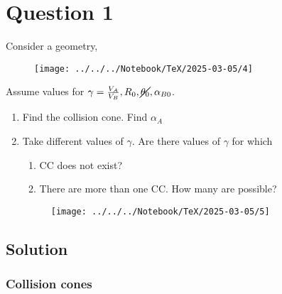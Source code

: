 \section*{Question 1}

Consider a geometry,
\vspace*{-1.5em}
\begin{figure}[htbp]
      \centering
      \texttt{[image: ../../../Notebook/TeX/2025-03-05/4]}
\end{figure}
\vspace*{-1.5em}
Assume values for \( \gamma = \frac{V_A}{V_B}, R_0, \cancel{\theta_0}, \alpha_{B0} \).
\begin{enumerate}[label= (\alph*), noitemsep, topsep=0pt]
      \item Find the collision cone.
            Find \( \alpha_A \)
      \item Take different values of \( \gamma \).
            Are there values of \( \gamma \) for which
            \begin{enumerate}[label= (\alph*), noitemsep, topsep=0pt]
                  \item CC does not exist?
                  \item There are more than one CC.
                        How many are possible?
            \end{enumerate}
            \vspace*{-1.5em}
            \begin{figure}[htbp]
                  \centering
                  \texttt{[image: ../../../Notebook/TeX/2025-03-05/5]}
            \end{figure}
\end{enumerate}

\vspace*{-3em}
\subsection*{Solution}

\subsubsection*{Collision cones}

